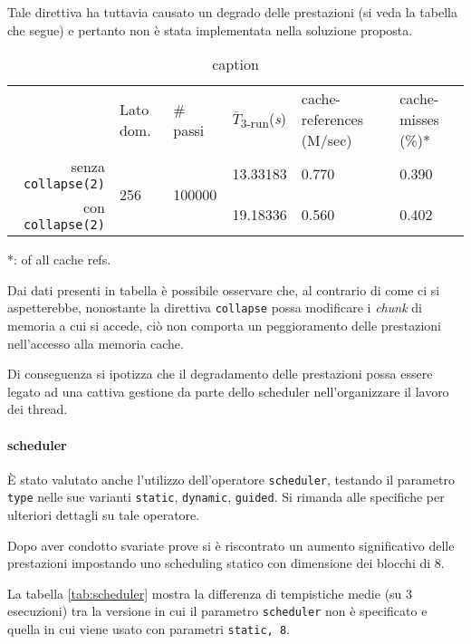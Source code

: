 Tale direttiva ha tuttavia causato un degrado delle prestazioni (si veda la
tabella che segue) e pertanto non è stata implementata nella soluzione proposta.

\begin{table}[ht]
\begin{tabularx}{\linewidth}{rXXXXX}
\cmidrule[\heavyrulewidth]{2-6}
& Lato dom. & \# passi & $\overline{T}$\textsubscript{3-run}(\textit{s})
& cache-references (M/sec) & cache-misses (\%)*\\
\cmidrule[\lightrulewidth]{2-6}
senza \texttt{collapse(2)} & \multirow{2}{*}{256} & \multirow{2}{*}{100000} &
   13.33183 & 0.770 & 0.390\\
\cmidrule{4-6}
   con \texttt{collapse(2)} &&& 19.18336 & 0.560 & 0.402\\
\cmidrule[\heavyrulewidth]{2-6}
\end{tabularx}
\caption{caption}
\end{table}

*: of all cache refs.

Dai dati presenti in tabella è possibile osservare che, al contrario di come ci
si aspetterebbe, nonostante la direttiva \texttt{collapse} possa modificare i
\textit{chunk} di memoria a cui si accede, ciò non comporta un peggioramento
delle prestazioni nell'accesso alla memoria cache.

Di conseguenza si ipotizza che il degradamento delle prestazioni possa essere
legato ad una cattiva gestione da parte dello scheduler nell'organizzare il
lavoro dei thread.

\paragraph{scheduler}

È stato valutato anche l'utilizzo dell'operatore \texttt{scheduler}, testando il
parametro \texttt{type} nelle sue varianti \texttt{static}, \texttt{dynamic},
\texttt{guided}.
Si rimanda alle specifiche \cite{openmp2018reference} per ulteriori dettagli su
tale operatore.

Dopo aver condotto svariate prove si è riscontrato un aumento significativo
delle prestazioni impostando uno scheduling statico con dimensione dei blocchi
di 8.

La tabella \ref{tab:scheduler} mostra la differenza di tempistiche medie (su 3
esecuzioni) tra la versione in cui il parametro \texttt{scheduler} non è
specificato e quella in cui viene usato con parametri \texttt{static, 8}.

